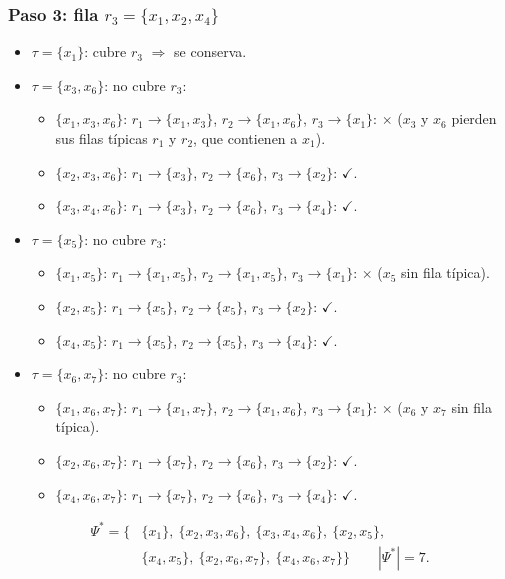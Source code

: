 \documentclass[11pt, a4paper]{article}
\theoremstyle{definition}
\theoremstyle{plain}
\newcommand{\Psis}{\Psi^{*}}
\newcommand{\x}[1]{x_{#1}}
\newcommand{\cj}[1]{\{#1\}}
\newcommand{\si}{\textcolor{green!50!black}{\ensuremath{\checkmark}}}
\newcommand{\no}{\textcolor{red!70!black}{\ensuremath{\times}}}
\begin{document}
\subsubsection*{Paso 3: fila $r_3=\cj{\x1,\x2,\x4}$}
\begin{itemize}[nosep]
\item $\tau=\cj{\x1}$: cubre $r_3$ $\Rightarrow$ se conserva.
\item $\tau=\cj{\x3,\x6}$: no cubre $r_3$:
  \begin{itemize}[nosep]
  \item $\cj{\x1,\x3,\x6}$: $r_1\to\cj{\x1,\x3}$, $r_2\to\cj{\x1,\x6}$, $r_3\to\cj{\x1}$: \no{} ($\x3$ y $\x6$ pierden sus filas típicas $r_1$ y $r_2$, que contienen a $\x1$).
  \item $\cj{\x2,\x3,\x6}$: $r_1\to\cj{\x3}$, $r_2\to\cj{\x6}$, $r_3\to\cj{\x2}$: \si.
  \item $\cj{\x3,\x4,\x6}$: $r_1\to\cj{\x3}$, $r_2\to\cj{\x6}$, $r_3\to\cj{\x4}$: \si.
  \end{itemize}
\item $\tau=\cj{\x5}$: no cubre $r_3$:
  \begin{itemize}[nosep]
  \item $\cj{\x1,\x5}$: $r_1\to\cj{\x1,\x5}$, $r_2\to\cj{\x1,\x5}$, $r_3\to\cj{\x1}$: \no{} ($\x5$ sin fila típica).
  \item $\cj{\x2,\x5}$: $r_1\to\cj{\x5}$, $r_2\to\cj{\x5}$, $r_3\to\cj{\x2}$: \si.
  \item $\cj{\x4,\x5}$: $r_1\to\cj{\x5}$, $r_2\to\cj{\x5}$, $r_3\to\cj{\x4}$: \si.
  \end{itemize}
\item $\tau=\cj{\x6,\x7}$: no cubre $r_3$:
  \begin{itemize}[nosep]
  \item $\cj{\x1,\x6,\x7}$: $r_1\to\cj{\x1,\x7}$, $r_2\to\cj{\x1,\x6}$, $r_3\to\cj{\x1}$: \no{} ($\x6$ y $\x7$ sin fila típica).
  \item $\cj{\x2,\x6,\x7}$: $r_1\to\cj{\x7}$, $r_2\to\cj{\x6}$, $r_3\to\cj{\x2}$: \si.
  \item $\cj{\x4,\x6,\x7}$: $r_1\to\cj{\x7}$, $r_2\to\cj{\x6}$, $r_3\to\cj{\x4}$: \si.
  \end{itemize}
\end{itemize}
\[
\begin{aligned}
\Psis=\big\{&\cj{\x1},\ \cj{\x2,\x3,\x6},\ \cj{\x3,\x4,\x6},\ \cj{\x2,\x5},\\
&\cj{\x4,\x5},\ \cj{\x2,\x6,\x7},\ \cj{\x4,\x6,\x7}\big\}\qquad |\Psis|=7.
\end{aligned}
\]
\end{document}
